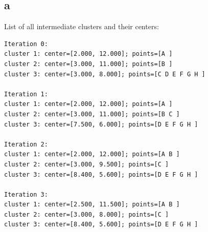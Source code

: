 \subsection*{a}
List of all intermediate clusters and their centers:
\begin{verbatim}
Iteration 0:
cluster 1: center=[2.000, 12.000]; points=[A ]
cluster 2: center=[3.000, 11.000]; points=[B ]
cluster 3: center=[3.000, 8.000]; points=[C D E F G H ]

Iteration 1:
cluster 1: center=[2.000, 12.000]; points=[A ]
cluster 2: center=[3.000, 11.000]; points=[B C ]
cluster 3: center=[7.500, 6.000]; points=[D E F G H ]

Iteration 2:
cluster 1: center=[2.000, 12.000]; points=[A B ]
cluster 2: center=[3.000, 9.500]; points=[C ]
cluster 3: center=[8.400, 5.600]; points=[D E F G H ]

Iteration 3:
cluster 1: center=[2.500, 11.500]; points=[A B ]
cluster 2: center=[3.000, 8.000]; points=[C ]
cluster 3: center=[8.400, 5.600]; points=[D E F G H ]
\end{verbatim}
\newpage
